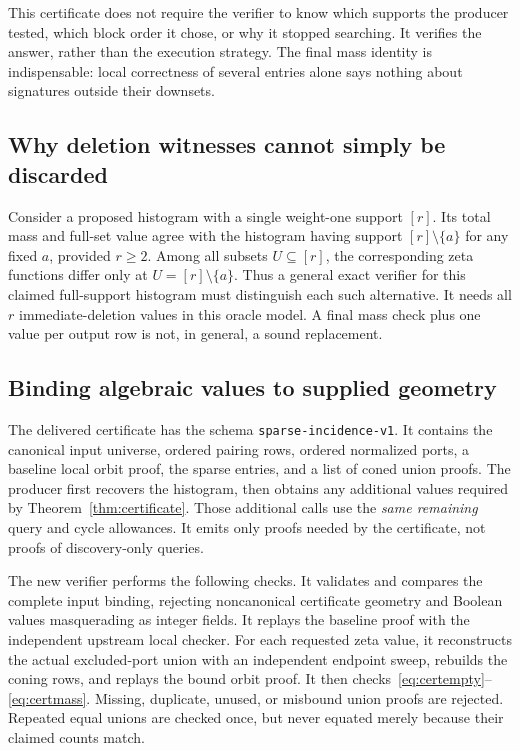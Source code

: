 \documentclass[11pt,letterpaper]{article}
\newcommand{\code}[1]{\nolinkurl{#1}}
\begin{document}
This certificate does not require the verifier to know which supports the
producer tested, which block order it chose, or why it stopped searching.
It verifies the answer, rather than the execution strategy. The final mass
identity is indispensable: local correctness of several entries alone says
nothing about signatures outside their downsets.

\subsection{Why deletion witnesses cannot simply be discarded}
Consider a proposed histogram with a single weight-one support $[r]$. Its
total mass and full-set value agree with the histogram having support
$[r]\setminus\{a\}$ for any fixed $a$, provided $r\geq2$. Among all subsets
$U\subseteq[r]$, the corresponding zeta functions differ only at
$U=[r]\setminus\{a\}$. Thus a general exact verifier for this claimed
full-support histogram must distinguish each such alternative. It needs all
$r$ immediate-deletion values in this oracle model. A final mass check plus
one value per output row is not, in general, a sound replacement.

\subsection{Binding algebraic values to supplied geometry}
The delivered certificate has the schema \code{sparse-incidence-v1}. It
contains the canonical input universe, ordered pairing rows, ordered normalized
ports, a baseline local orbit proof, the sparse entries, and a list of coned
union proofs. The producer first recovers the histogram, then obtains any
additional values required by Theorem~\ref{thm:certificate}. Those additional
calls use the \emph{same remaining} query and cycle allowances. It emits only
proofs needed by the certificate, not proofs of discovery-only queries.

The new verifier performs the following checks. It validates and compares
the complete input binding, rejecting noncanonical certificate geometry and
Boolean values masquerading as integer fields. It replays the baseline proof
with the independent upstream local checker. For each requested zeta value,
it reconstructs the actual excluded-port union with an independent endpoint
sweep, rebuilds the coning rows, and replays the bound orbit proof. It then
checks~\eqref{eq:certempty}--\eqref{eq:certmass}. Missing, duplicate, unused,
or misbound union proofs are rejected. Repeated equal unions are checked
once, but never equated merely because their claimed counts match.
\end{document}
